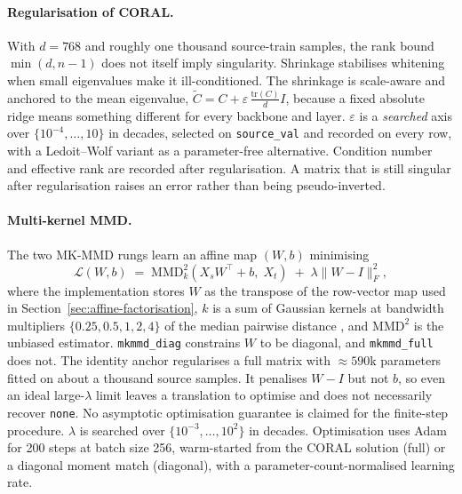 \paragraph{Regularisation of CORAL.} With $d = 768$ and roughly one thousand
source-train samples, the rank bound $\min(d,n-1)$ does not itself imply
singularity. Shrinkage stabilises whitening when small eigenvalues make it
ill-conditioned. The shrinkage is scale-aware and anchored to the mean
eigenvalue, $\tilde{C} = C + \varepsilon\,\frac{\mathrm{tr}(C)}{d} I$, because a
fixed absolute ridge means something different for every backbone and layer.
$\varepsilon$ is a \emph{searched} axis over $\{10^{-4}, \ldots, 10\}$ in
decades, selected on \texttt{source\_val} and recorded on every row, with a
Ledoit--Wolf variant \cite{ledoit2004covariance} as a parameter-free
alternative. Condition number and effective rank are recorded after
regularisation. A matrix that is still singular after regularisation raises an
error rather than being pseudo-inverted.

\paragraph{Multi-kernel MMD.} The two MK-MMD rungs learn an affine map
$(W, b)$ minimising
\begin{equation}
  \mathcal{L}(W, b) \;=\;
  \mathrm{MMD}^2_k\!\left(X_s W^\top + b,\; X_t\right)
  \;+\; \lambda \lVert W - I \rVert_F^2 ,
  \label{eq:mkmmd}
\end{equation}
where the implementation stores $W$ as the transpose of the row-vector map
used in Section~\ref{sec:affine-factorisation}, $k$ is a sum of Gaussian
kernels at bandwidth multipliers $\{0.25, 0.5, 1, 2, 4\}$ of the median
pairwise distance \cite{gretton2012kernel}, and $\mathrm{MMD}^2$ is the
unbiased estimator. \texttt{mkmmd\_diag} constrains $W$ to be diagonal, and
\texttt{mkmmd\_full} does not. The identity anchor regularises a full matrix
with $\approx 590$k parameters fitted on about a thousand source samples. It
penalises $W-I$ but not $b$, so even an ideal large-$\lambda$ limit leaves a
translation to optimise and does not necessarily recover \texttt{none}. No
asymptotic optimisation guarantee is claimed for the finite-step procedure.
$\lambda$ is searched over $\{10^{-3}, \ldots, 10^{2}\}$ in decades.
Optimisation uses Adam \cite{kingma2015adam} for 200 steps at batch size 256,
warm-started from the CORAL solution (full) or a diagonal moment match
(diagonal), with a parameter-count-normalised learning rate.


